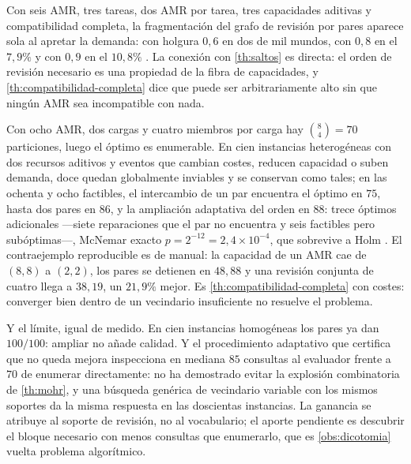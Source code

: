 \begin{observacion}
\label{obs:fragmentacion-aleatoria}
Con seis AMR, tres tareas, dos AMR por tarea, tres capacidades aditivas y
compatibilidad completa, la fragmentación del grafo de revisión por pares
aparece sola al apretar la demanda: con holgura $0{,}6$ en dos de mil
mundos, con $0{,}8$ en el $7{,}9\%$ y con $0{,}9$ en el $10{,}8\%$
\cite{mayorga2026compendio}. La conexión con \cref{th:saltos} es directa: el
orden de revisión necesario es una propiedad de la fibra de capacidades, y
\cref{th:compatibilidad-completa} dice que puede ser arbitrariamente alto sin
que ningún AMR sea incompatible con nada.
\end{observacion}

\begin{observacion}
\label{obs:revision-conjunta-r11}
Con ocho AMR, dos cargas y cuatro miembros por carga hay $\binom84=70$
particiones, luego el óptimo es enumerable. En cien instancias heterogéneas
con dos recursos aditivos y eventos que cambian costes, reducen capacidad o
suben demanda, doce quedan globalmente inviables y se conservan como tales;
en las ochenta y ocho factibles, el intercambio de un par encuentra el óptimo
en $75$, hasta dos pares en $86$, y la ampliación adaptativa del orden en
$88$: trece óptimos adicionales —siete reparaciones que el par no encuentra y
seis factibles pero subóptimas—, McNemar exacto $p=2^{-12}=2{,}4\times10^{-4}$,
que sobrevive a Holm \cite{mrob2026r11}. El contraejemplo reproducible es de
manual: la capacidad de un AMR cae de $(8,8)$ a $(2,2)$, los pares se detienen
en $48{,}88$ y una revisión conjunta de cuatro llega a $38{,}19$, un $21{,}9\%$
mejor. Es \cref{th:compatibilidad-completa} con costes: converger bien dentro
de un vecindario insuficiente no resuelve el problema.

Y el límite, igual de medido. En cien instancias homogéneas los pares ya dan
$100/100$: ampliar no añade calidad. Y el procedimiento adaptativo que
certifica que no queda mejora inspecciona en mediana $85$ consultas al
evaluador frente a $70$ de enumerar directamente: no ha demostrado evitar la
explosión combinatoria de \cref{th:mohr}, y una búsqueda genérica de
vecindario variable con los mismos soportes da la misma respuesta en las
doscientas instancias. La ganancia se atribuye al soporte de revisión, no al
vocabulario; el aporte pendiente es descubrir el bloque necesario con menos
consultas que enumerarlo, que es \cref{obs:dicotomia} vuelta problema
algorítmico.
\end{observacion}

